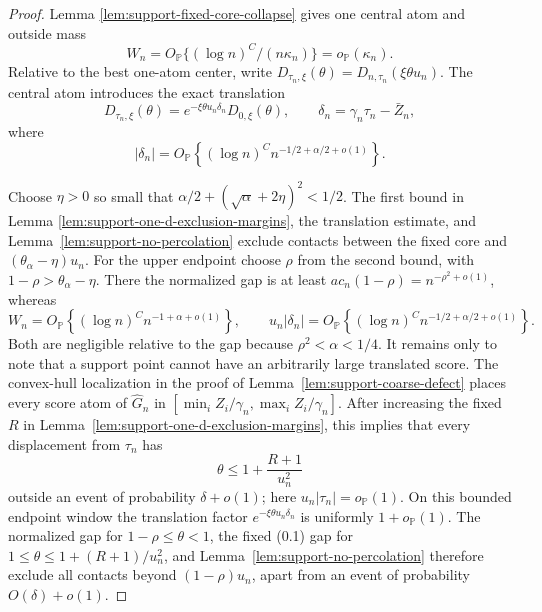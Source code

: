 \begin{proof}
Lemma
\ref{lem:support-fixed-core-collapse} gives one central atom and outside mass
\[
    W_n=O_{\mathbb P}\{(\log n)^C/(n\kappa_n)\}
        =o_{\mathbb P}(\kappa_n).
\]
Relative to the best one-atom center, write
\(D_{\tau_n,\xi}(\theta)=D_{n,\tau_n}(\xi\theta u_n)\). The central atom
introduces the exact translation
\[
 D_{\tau_n,\xi}(\theta)
 =e^{-\xi\theta u_n\delta_n}D_{0,\xi}(\theta),
 \qquad \delta_n=\gamma_n\tau_n-\bar Z_n,
\]
where
\[
    |\delta_n|
    =O_{\mathbb P}\!\left\{(\log n)^C
      n^{-1/2+\alpha/2+o(1)}\right\}.
\]

Choose \(\eta>0\) so small that
\(\alpha/2+(\sqrt\alpha+2\eta)^2<1/2\). The first bound in Lemma
\ref{lem:support-one-d-exclusion-margins}, the translation estimate, and
Lemma~\ref{lem:support-no-percolation} exclude contacts between the fixed core
and \((\theta_\alpha-\eta)u_n\). For the upper endpoint choose \(\rho\) from
the second bound, with \(1-\rho>\theta_\alpha-\eta\). There the normalized
gap is at least \(ac_n(1-\rho)=n^{-\rho^2+o(1)}\), whereas
\[
    W_n=O_{\mathbb P}\!\left\{(\log n)^C
      n^{-1+\alpha+o(1)}\right\},
    \qquad
    u_n|\delta_n|
    =O_{\mathbb P}\!\left\{(\log n)^C
      n^{-1/2+\alpha/2+o(1)}\right\}.
\]
Both are negligible relative to the gap because \(\rho^2<\alpha<1/4\).
It remains only to note that a support point cannot have an arbitrarily large
translated score. The convex-hull localization in the proof of
Lemma~\ref{lem:support-coarse-defect} places every score atom of
\(\widehat G_n\) in
\([\min_iZ_i/\gamma_n,\max_iZ_i/\gamma_n]\). After increasing the fixed
\(R\) in Lemma~\ref{lem:support-one-d-exclusion-margins}, this implies that
every displacement from \(\tau_n\) has
\[
    \theta\le1+\frac{R+1}{u_n^2}
\]
outside an event of probability \(\delta+o(1)\); here
\(u_n|\tau_n|=o_{\mathbb P}(1)\). On this bounded endpoint window the
translation factor \(e^{-\xi\theta u_n\delta_n}\) is uniformly
\(1+o_{\mathbb P}(1)\). The normalized gap for \(1-\rho\le\theta<1\), the
fixed (0.1) gap for \(1\le\theta\le1+(R+1)/u_n^2\), and
Lemma~\ref{lem:support-no-percolation} therefore exclude all contacts beyond
\((1-\rho)u_n\), apart from an event of probability \(O(\delta)+o(1)\).


\end{proof}
